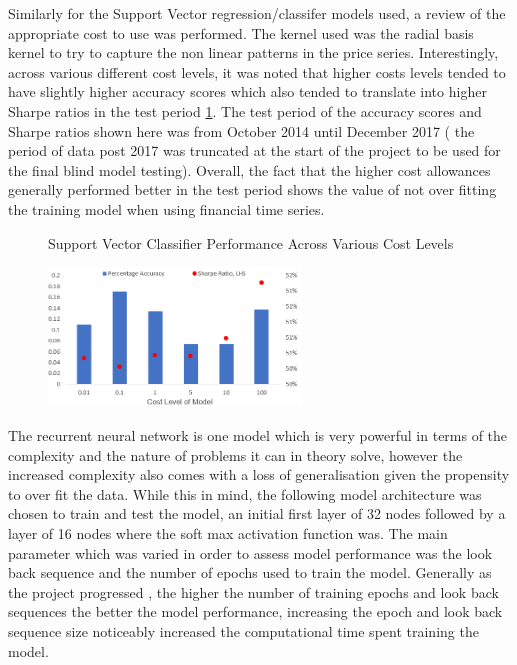 \documentclass[11pt]{article}
\begin{document}
Similarly for the Support Vector regression/classifer models used, a review of the appropriate cost to use was performed. The kernel used was the radial basis kernel to try to capture the non linear patterns in the price series. Interestingly, across various different cost levels, it was noted that higher costs levels tended to have slightly higher accuracy scores which also tended to translate into higher Sharpe ratios in the test period \ref{fig:SVMCost}. The test period of the accuracy scores and Sharpe ratios shown here was from October 2014 until December 2017 ( the period of data post 2017 was truncated at the start of the project to be used for the final blind model testing). Overall, the fact that the higher cost allowances generally performed better in the test period shows the value of not over fitting the training model when using financial time series. 
\begin{figure}[h]
    \centering
	\caption{Support Vector Classifier Performance Across Various Cost Levels}    
	\includegraphics[width=0.6\textwidth]{SVMCost}
    \label{fig:SVMCost}
     \caption*{}
\end{figure}
The recurrent neural network is one model which is very powerful in terms of the complexity and the nature of problems it can in theory solve, however the increased complexity also comes with a loss of generalisation given the propensity to over fit the data. While this in mind, the following model architecture was chosen to train and test the model, an initial first layer of 32 nodes followed by a layer of 16 nodes where the soft max activation function was. The main parameter which was varied in order to assess model performance was the look back sequence and the number of epochs used to train the model. Generally as the project progressed , the higher the number of training epochs and look back sequences the better the model performance, increasing the epoch and look back sequence size noticeably increased the computational time spent training the model.
\end{document}
